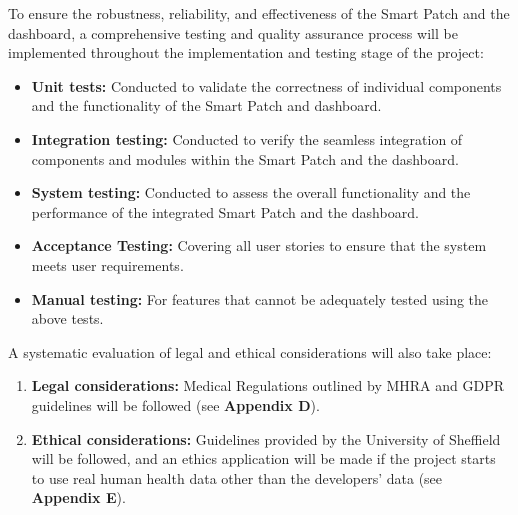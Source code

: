 To ensure the robustness, reliability, and effectiveness of the Smart Patch and the dashboard, a comprehensive testing and quality assurance process will be implemented throughout the implementation and testing stage of the project:
\begin{itemize}
    \item \textbf{Unit tests:} Conducted to validate the correctness of individual components and the functionality of the Smart Patch and dashboard.
    \item \textbf{Integration testing:} Conducted to verify the seamless integration of components and modules within the Smart Patch and the dashboard.
    \item \textbf{System testing:} Conducted to assess the overall functionality and the performance of the integrated Smart Patch and the dashboard.
    \item \textbf{Acceptance Testing:} Covering all user stories to ensure that the system meets user requirements.
    \item \textbf{Manual testing:} For features that cannot be adequately tested using the above tests.
\end{itemize} 
A systematic evaluation of legal and ethical considerations will also take place:
\begin{enumerate}
    \item \textbf{Legal considerations:} Medical Regulations outlined by MHRA and GDPR guidelines will be followed (see \textbf{Appendix D}).
    \item \textbf{Ethical considerations:} Guidelines provided by the University of Sheffield will be followed, and an ethics application will be made if the project starts to use real human health data other than the developers' data (see \textbf{Appendix E}).
\end{enumerate}


